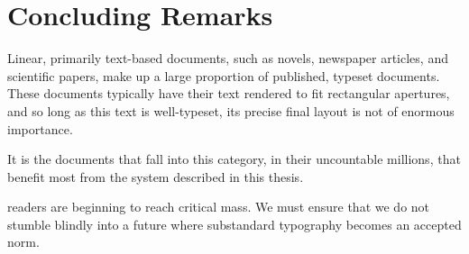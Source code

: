 \section{Concluding Remarks}

Linear, primarily text-based documents, such as novels, newspaper articles, and scientific papers, make up a large proportion of published, typeset documents. These documents typically have their text rendered to fit rectangular apertures, and so long as this text is well-typeset, its precise final layout is not of enormous importance.

\vspace{0.4in}

\noindent
It is the documents that fall into this category, in their uncountable millions, that benefit most from the system described in this thesis.

\vspace{0.4in}

\noindent
\Ebook{} readers are beginning to reach critical mass. We must ensure that we do not stumble blindly into a future where substandard typography becomes an accepted norm.

